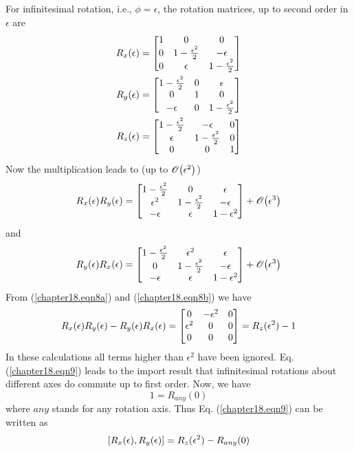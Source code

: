 For infinitesimal rotation, i.e., $\phi=\epsilon$, the rotation matrices, up to second order in $\epsilon$ are
\begin{align}
\label{chapter18.eqn7}
\begin{split}
R_x\qty(\epsilon) = \mqty[1 & 0 & 0 \\ 0 & 1-\frac{\epsilon^2}{2} &- \epsilon \\ 0 & \epsilon & 1 - \frac{\epsilon^2}{2}] \\
R_y\qty(\epsilon) = \mqty[1 - \frac{\epsilon^2}{2} & 0 & \epsilon \\ 0 & 1 & 0 \\ -\epsilon & 0 & 1 - \frac{\epsilon^2}{2}] \\
R_z\qty(\epsilon) = \mqty[1 - \frac{\epsilon^2}{2} & -\epsilon & 0 \\ \epsilon & 1 - \frac{\epsilon^2}{2} & 0 \\ 0 & 0 & 1]
\end{split}
\end{align}
Now the multiplication leads to (up to $\order{\epsilon^2}$)
\begin{equation}
\label{chapter18.eqn8a}
R_x\qty(\epsilon) R_y\qty(\epsilon) = \mqty[1-\frac{\epsilon^2}{2} & 0 & \epsilon\\ \epsilon^2 & 1- \frac{\epsilon^2}{2} & -\epsilon\\ -\epsilon & \epsilon & 1-\epsilon^2] + \order{\epsilon^3}
\end{equation}
and
\begin{equation}
\label{chapter18.eqn8b}
R_y\qty(\epsilon) R_x\qty(\epsilon) = \mqty[1-\frac{\epsilon^2}{2} & \epsilon^2 & \epsilon\\ 0 & 1- \frac{\epsilon^2}{2} & -\epsilon\\ -\epsilon & \epsilon & 1-\epsilon^2] + \order{\epsilon^3}
\end{equation}
From (\ref{chapter18.eqn8a}) and (\ref{chapter18.eqn8b}) we have
\begin{equation}
\label{chapter18.eqn9}
R_x(\epsilon) R_y(\epsilon) - R_y(\epsilon)  R_x(\epsilon) = \mqty[0 & -\epsilon^2 & 0 \\ \epsilon^2 & 0 & 0 \\ 0 & 0 & 0] = R_z(\epsilon^2) - 1
\end{equation}
In these calculations all terms higher than $\epsilon^2$ have been ignored. Eq. (\ref{chapter18.eqn9}) leads to the import result that infinitesimal rotations about different axes do commute up to first order. Now, we have
\begin{equation}
\label{chapter18.eqn10}
1 = R_{any}(0)
\end{equation}
where $any$ stands for any rotation axis. Thus Eq. (\ref{chapter18.eqn9}) can be written as
\begin{equation}
\label{chapter18.eqn11}
\comm{R_x(\epsilon)}{R_y(\epsilon)} = R_z(\epsilon^2) - R_{any}(0)
\end{equation}

